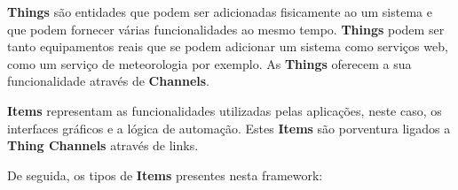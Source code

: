 \textbf{Things} são entidades que podem ser adicionadas fisicamente ao um sistema e que podem fornecer várias funcionalidades ao mesmo tempo. \textbf{Things} podem ser tanto equipamentos reais que se podem adicionar um sistema como serviços web, como um serviço de meteorologia por exemplo. As \textbf{Things} oferecem a sua funcionalidade através de \textbf{Channels}.

\textbf{Items} representam as funcionalidades utilizadas pelas aplicações, neste caso, os interfaces gráficos e a lógica de automação. Estes \textbf{Items} são porventura ligados a \textbf{Thing Channels}  através de links.

De seguida, os tipos de \textbf{Items} presentes nesta framework:

\begin{table}[H]
\centering
{}
\end{table}
